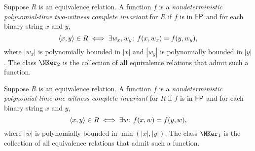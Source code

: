 \begin{definition}\label{def:npeq7}
  Suppose $R$ is an equivalence relation.
  A function $f$ is a \emph{nondeterministic polynomial-time two-witness complete invariant} for $R$ if $f$ is in ${\mathsf{FP}}$ and for each binary string $x$ and $y$,
  \begin{displaymath}
    \langle x,y\rangle \in R \iff \exists w_x, w_y \colon f(x, w_x) = f(y, w_y),
  \end{displaymath}
  where $|w_x|$ is polynomially bounded in $|x|$ and $|w_y|$ is polynomially bounded in $|y|$.
  The class $\NKer_2$ is the collection of all equivalence relations that admit such a function.
\end{definition}

\begin{definition}\label{def:npeq8}
  Suppose $R$ is an equivalence relation.
  A function $f$ is a \emph{nondeterministic polynomial-time one-witness complete invariant} for $R$ if $f$ is in ${\mathsf{FP}}$ and for each binary string $x$ and $y$,
  \begin{displaymath}
    \langle x,y\rangle \in R \iff \exists w \colon f(x, w) = f(y, w),
  \end{displaymath}
  where $|w|$ is polynomially bounded in $\min(|x|, |y|)$.
  The class $\NKer_1$ is the collection of all equivalence relations that admit such a function.
\end{definition}

